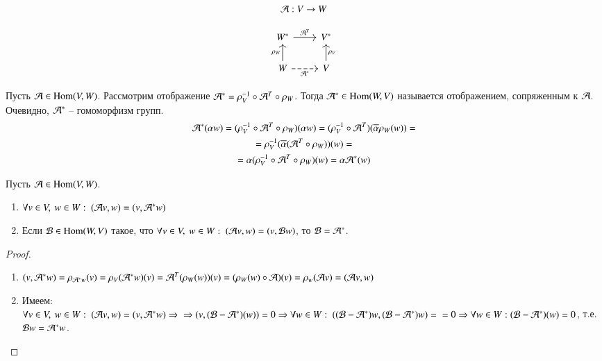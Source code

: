 \documentclass[main]{subfiles}
\begin{document}
\[ \mathcal{A}: V \rightarrow W\]

\[\begin{tikzcd}
        {W^*} & {V^*} \\
        W & V
        \arrow["{\mathcal{A}^T}", from=1-1, to=1-2]
        \arrow["{\rho_V}"', from=2-2, to=1-2]
        \arrow["{\rho_W}", from=2-1, to=1-1]
        \arrow["{\mathcal{A}^*}"', dashed, from=2-1, to=2-2]
    \end{tikzcd}\]

Пусть $\mathcal{A} \in \operatorname{Hom}(V, W)$. Рассмотрим отображение $\mathcal{A}^* = \rho_V^{-1} \circ \mathcal{A}^T \circ \rho_W$. Тогда $\mathcal{A}^* \in \operatorname{Hom}(W, V)$ называется отображением, сопряженным к $\mathcal{A}$.
Очевидно, $\mathcal{A}^*$ -- гомоморфизм групп.
\begin{gather*}
    \mathcal{A}^*(\alpha w) = (\rho_V^{-1} \circ \mathcal{A}^T \circ \rho_W)(\alpha w) = (\rho_V^{-1} \circ \mathcal{A}^T)(\overline{\alpha} \rho_W(w)) = \\
    = \rho_V^{-1} (\overline{\alpha} ( \mathcal{A}^T \circ \rho_W))(w) = \\
    = \alpha (\rho_V^{-1} \circ \mathcal{A}^T \circ \rho_W) (w) = \alpha \mathcal{A}^* (w)
\end{gather*}

\begin{proposition} 
    Пусть $\mathcal{A} \in \operatorname{Hom}(V, W)$.

    \begin{enumerate}
        \item $\forall v \in V, \ w \in W: \ (\mathcal{A} v, w) = (v, \mathcal{A}^* w)$
        \item Если $\mathcal{B} \in \operatorname{Hom} (W, V)$ такое, что $\forall v \in V, \ w \in W: \ (\mca v, w) = (v, \mcb w)$,  то $\mathcal{B} = \mathcal{A}^*$.
    \end{enumerate}
\end{proposition}

\begin{proof}
    \begin{enumerate}
        \item $(v, \mathcal{A}^* w) = \rho_{\mathcal{A}^* w} (v) = \rho_V (\mathcal{A}^*w)(v) = \mathcal{A}^T(\rho_W(w))(v) = (\rho_W(w) \circ \mathcal{A})(v) = \rho_w (\mathcal{A} v) = (\mathcal{A} v, w)$
        \item Имеем: $\forall v \in V, \ w \in W: \ (\mca v, w) = (v, \mca^* w) \Rightarrow \\ \Rightarrow (v, (\mcb - \mca^*)(w)) = 0 \Rightarrow \forall w \in W: \ ((\mcb - \mca^*)w, (\mcb - \mca^*)w) = \\ = 0 \Rightarrow \forall w \in W: (\mcb - \mca^*)(w) = 0$, т.е. $\mathcal{B} w = \mathcal{A}^* w$.
    \end{enumerate}
\end{proof}
\end{document}
